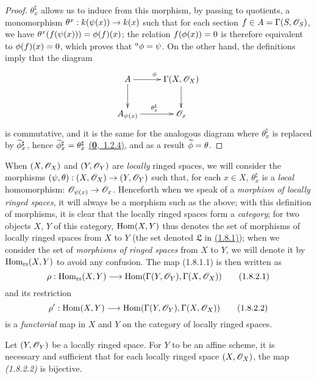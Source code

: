 \begin{proof}
$\theta_x^\sharp$ allows us to induce from this morphism, by passing to quotients, a
monomorphism $\theta^x:k(\psi(x))\to k(x)$ such that for each section
$f\in A=\Gamma(S,\mathscr{O}_S)$, we have $\theta^x(f(\psi(x)))=\phi(f)(x)$; the relation
$f(\phi(x))=0$ is therefore equivalent to $\phi(f)(x)=0$, which proves that
${}^a\phi=\psi$. On the other hand, the definitions imply that the diagram
\[
  \xymatrix{
    A\ar[r]^\vphi\ar[d] &
    \Gamma(X,\OO_X)\ar[d]\\
    A_{\psi(x)}\ar[r]^{\theta_x^\sharp} &
    \OO_x
  }
\]
is commutative, and it is the same for the analogous diagram where $\theta_x^\sharp$ is
replaced by $\widetilde{\phi}_x^\sharp$, hence $\widetilde{\phi}_x^\sharp=\theta_x^\sharp$
\hyperref[env-0.1.2.4]{(\textbf{0},~1.2.4)}, and as a result $\widetilde{\phi}=\theta$.
\end{proof}

\begin{env}[1.8.2]
\label{env-1.1.8.2}
When $(X,\mathscr{O}_X)$ and $(Y,\mathscr{O}_Y)$ are {\em locally} ringed spaces, we will consider the
morphisms $(\psi,\theta):(X,\mathscr{O}_X)\to(Y,\mathscr{O}_Y)$ such that, for each $x\in X$,
$\theta_x^\sharp$ is a {\em local} homomorphism: $\mathscr{O}_{\psi(x)}\to\mathscr{O}_x$. Henceforth when
we speak
of a {\em morphism of locally ringed spaces}, it will always be a morphism such as the
above; with this definition of morphisms, it is clear that the locally ringed spaces form a
{\em category}; for two objects $X$, $Y$ of this category, ${\mathop{\mathrm{Hom}}\nolimits}(X,Y)$ thus denotes the set
of morphisms of locally ringed spaces from $X$ to $Y$ (the set denoted $\mathfrak{L}$ in
\hyperref[prop-1.1.8.1]{(1.8.1)}); when we consider the set of {\em morphisms of ringed spaces} from $X$
to $Y$, we will denote it by ${\mathop{\mathrm{Hom}}\nolimits}_\text{rs}(X,Y)$ to avoid any confusion. The map (1.8.1.1)
is then written as
\[
  \rho:{\mathop{\mathrm{Hom}}\nolimits}_\text{rs}(X,Y)\longrightarrow{\mathop{\mathrm{Hom}}\nolimits}(\Gamma(Y,\mathscr{O}_Y),\Gamma(X,\mathscr{O}_X))
  \tag{1.8.2.1}
\]
and its restriction
\[
  \rho':{\mathop{\mathrm{Hom}}\nolimits}(X,Y)\longrightarrow{\mathop{\mathrm{Hom}}\nolimits}(\Gamma(Y,\mathscr{O}_Y),\Gamma(X,\mathscr{O}_X))
  \tag{1.8.2.2}
\]
is a {\em functorial} map in $X$ and $Y$ on the category of locally ringed spaces.
\end{env}

\begin{cor}[1.8.3]
\label{cor-1.1.8.3}
Let $(Y,\mathscr{O}_Y)$ be a locally ringed space. For $Y$ to be an affine scheme, it is necessary
and sufficient that for each locally ringed space $(X,\mathscr{O}_X)$, the map {\em (1.8.2.2)} is
bijective.
\end{cor}

